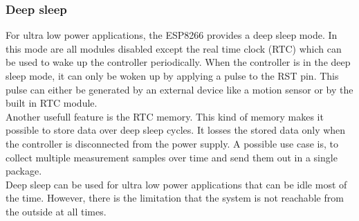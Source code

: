 \subsubsection{Deep sleep} \label{sec:deep_sleep}
For ultra low power applications, the ESP8266 provides a deep sleep mode.
In this mode are all modules disabled except the real time clock (RTC) which can be used to wake up the controller periodically.
When the controller is in the deep sleep mode, it can only be woken up by applying a pulse to the RST pin.
This pulse can either be generated by an external device like a motion sensor or by the built in RTC module.\\
Another usefull feature is the RTC memory. This kind of memory makes it possible to store data over deep sleep cycles.
It losses the stored data only when the controller is disconnected from the power supply.
A possible use case is, to collect multiple measurement samples over time and send them out in a single package.\\
Deep sleep can be used for ultra low power applications that can be idle most of the time. 
However, there is the limitation that the system is not reachable from the outside at all times. \cite{espressif_inc_esp8266_2016}